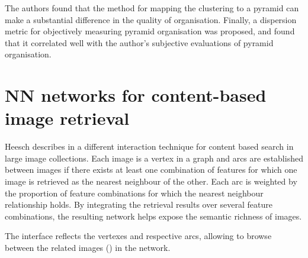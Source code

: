 The authors found that the method for mapping the clustering to a pyramid can make a substantial difference in the quality of organisation. Finally, a dispersion metric for objectively measuring pyramid organisation was proposed, and found that it correlated well with the author's subjective evaluations of pyramid organisation.



\section{NN networks for content-based image retrieval} %
\label{sub:Heesch}

Heesch describes in \cite{Heesch:2004p2675} a different interaction technique for content based search in large image collections. Each image is a vertex in a graph and arcs are established between images if there exists at least one combination of features for which one image is retrieved as the nearest neighbour of the other. Each arc is weighted by the proportion of feature combinations for which the nearest neighbour relationship holds. By integrating the retrieval results over several feature combinations, the resulting network helps expose the semantic richness of images.

The interface reflects the vertexes and respective arcs, allowing to browse between the related images () in the network.

